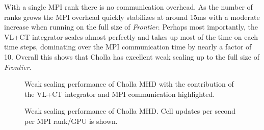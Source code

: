With a single MPI rank there is no communication overhead. As the number of ranks grows the MPI overhead quickly stabilizes at around 15ms with a moderate increase when running on the full size of \textit{Frontier}. Perhaps most importantly, the VL+CT integrator scales almost perfectly and takes up most of the time on each time steps, dominating over the MPI communication time by nearly a factor of 10. Overall this shows that Cholla has excellent weak scaling up to the full size of \textit{Frontier}.



\begin{figure}[ht!]
    \caption{Weak scaling performance of Cholla MHD with the contribution of the VL+CT integrator and MPI communication highlighted.  }
    \label{fig:scaling-ms-per-gpu}
\end{figure}

\begin{figure}[ht!]
    \caption{Weak scaling performance of Cholla MHD. Cell updates per second per MPI rank/GPU is shown.  }
    \label{fig:scaling-cells-per-second}
\end{figure}

